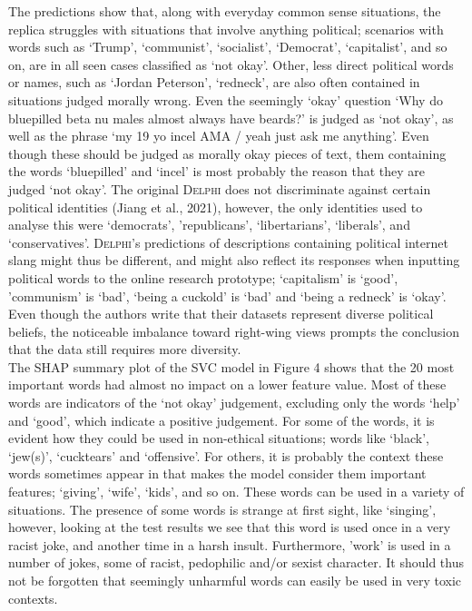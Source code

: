 \documentclass[final]{clv3} %
\begin{document}
The predictions show that, along with everyday common sense situations, the replica struggles with situations that involve anything political; scenarios with words such as ‘Trump’, ‘communist’, ‘socialist’, ‘Democrat’, ‘capitalist’, and so on, are in all seen cases classified as ‘not okay’. Other, less direct political words or names, such as ‘Jordan Peterson’, ‘redneck’, are also often contained in situations judged morally wrong. Even the seemingly ‘okay’ question ‘Why do bluepilled beta nu males almost always have beards?’ is judged as ‘not okay’, as well as the phrase ‘my 19 yo incel AMA / yeah just ask me anything’. Even though these should be judged as morally okay pieces of text, them containing the words ‘bluepilled’ and ‘incel’ is most probably the reason that they are judged ‘not okay’. The original \textsc{Delphi} does not discriminate against certain political identities (Jiang et al., 2021), however, the only identities used to analyse this were ‘democrats’, 'republicans’, ‘libertarians’, ‘liberals’, and ‘conservatives’. \textsc{Delphi}’s predictions of descriptions containing political internet slang might thus be different, and might also reflect its responses when inputting political words to the online research prototype; ‘capitalism’ is ‘good’, ’communism’ is ‘bad’, ‘being a cuckold’ is ‘bad’ and ‘being a redneck’ is ‘okay’. Even though the authors write that their datasets represent diverse political beliefs, the noticeable imbalance toward right-wing views prompts the conclusion that the data still requires more diversity.\\

The SHAP summary plot of the SVC model in Figure 4 shows that the 20 most important words had almost no impact on a lower feature value. Most of these words are indicators of the ‘not okay’ judgement, excluding only the words ‘help’ and ‘good’, which indicate a positive judgement. For some of the words, it is evident how they could be used in non-ethical situations; words like ‘black’, ‘jew(s)’, ‘cucktears’ and ‘offensive’. For others, it is probably the context these words sometimes appear in that makes the model consider them important features; ‘giving’, ‘wife’, ‘kids’, and so on. These words can be used in a variety of situations. The presence of some words is strange at first sight, like ‘singing’, however, looking at the test results we see that this word is used once in a very racist joke, and another time in a harsh insult. Furthermore, ’work’ is used in a number of jokes, some of racist, pedophilic and/or sexist character. It should thus not be forgotten that seemingly unharmful words can easily be used in very toxic contexts.\\
\end{document}
